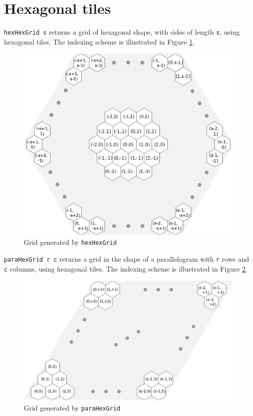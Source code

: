 \documentclass[a4paper,10pt]{article}
\begin{document}
\section{Hexagonal tiles}

\texttt{hexHexGrid s} returns a grid of hexagonal shape, with
sides of length \texttt{s}, using hexagonal tiles. 
The indexing scheme is illustrated in Figure \ref{fig:hexHexGrid}.

\begin{figure}[ht]
 \label{fig:hexHexGrid}
 \centering
 \includegraphics{./images/hexHexGrid.eps}
 \caption{Grid generated by \texttt{hexHexGrid}}
\end{figure}


\texttt{paraHexGrid r c} returns a grid in the shape of a parallelogram with \texttt{r} rows and \texttt{c} columns, using hexagonal tiles. 
The indexing scheme is illustrated in Figure \ref{fig:paraHexGrid}.

\begin{figure}[ht]
 \label{fig:paraHexGrid}
 \centering
 \includegraphics{./images/paraHexGrid.eps}
 \caption{Grid generated by \texttt{paraHexGrid}}
\end{figure}
\end{document}
